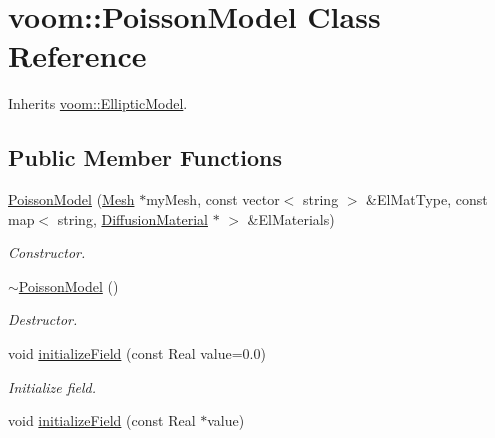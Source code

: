 \hypertarget{classvoom_1_1_poisson_model}{
\section{voom::PoissonModel Class Reference}
\label{classvoom_1_1_poisson_model}
}


Inherits \hyperlink{classvoom_1_1_elliptic_model}{voom::EllipticModel}.\subsection*{Public Member Functions}
\begin{DoxyCompactItemize}
\item 
\hypertarget{classvoom_1_1_poisson_model_aab711862cd787889ea7c472523b15ed1}{
\hyperlink{classvoom_1_1_poisson_model_aab711862cd787889ea7c472523b15ed1}{PoissonModel} (\hyperlink{classvoom_1_1_mesh}{Mesh} $\ast$myMesh, const vector$<$ string $>$ \&ElMatType, const map$<$ string, \hyperlink{classvoom_1_1_diffusion_material}{DiffusionMaterial} $\ast$ $>$ \&ElMaterials)}
\label{classvoom_1_1_poisson_model_aab711862cd787889ea7c472523b15ed1}

\begin{DoxyCompactList}\small\item\em Constructor. \item\end{DoxyCompactList}\item 
\hypertarget{classvoom_1_1_poisson_model_ad86ec594230a943038a85a6ff491d200}{
\hyperlink{classvoom_1_1_poisson_model_ad86ec594230a943038a85a6ff491d200}{$\sim$PoissonModel} ()}
\label{classvoom_1_1_poisson_model_ad86ec594230a943038a85a6ff491d200}

\begin{DoxyCompactList}\small\item\em Destructor. \item\end{DoxyCompactList}\item 
\hypertarget{classvoom_1_1_poisson_model_a47a534d803f4adbd2cde4f95fcb85704}{
void \hyperlink{classvoom_1_1_poisson_model_a47a534d803f4adbd2cde4f95fcb85704}{initializeField} (const Real value=0.0)}
\label{classvoom_1_1_poisson_model_a47a534d803f4adbd2cde4f95fcb85704}

\begin{DoxyCompactList}\small\item\em Initialize field. \item\end{DoxyCompactList}\item 
\hypertarget{classvoom_1_1_poisson_model_a6ee2770be3608c762c20cb83806d98d2}{
void \hyperlink{classvoom_1_1_poisson_model_a6ee2770be3608c762c20cb83806d98d2}{initializeField} (const Real $\ast$value)}
\label{classvoom_1_1_poisson_model_a6ee2770be3608c762c20cb83806d98d2}


\end{DoxyCompactItemize}
